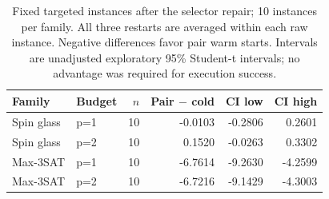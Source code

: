 \begin{table}[tb]
\centering\small
\begin{tabular}{llrrrr}
\hline
Family & Budget & $n$ & Pair $-$ cold & CI low & CI high \\
\hline
Spin glass & p=1 & 10 & -0.0103 & -0.2806 & 0.2601 \\
Spin glass & p=2 & 10 & 0.1520 & -0.0263 & 0.3302 \\
Max-3SAT & p=1 & 10 & -6.7614 & -9.2630 & -4.2599 \\
Max-3SAT & p=2 & 10 & -6.7216 & -9.1429 & -4.3003 \\
\hline
\end{tabular}
\caption{Fixed targeted instances after the selector repair; 10 instances per family. All three restarts are averaged within each raw instance. Negative differences favor pair warm starts. Intervals are unadjusted exploratory 95\% Student-t intervals; no advantage was required for execution success.}
\label{tab:targeted-selector-rerun-v3}
\end{table}
